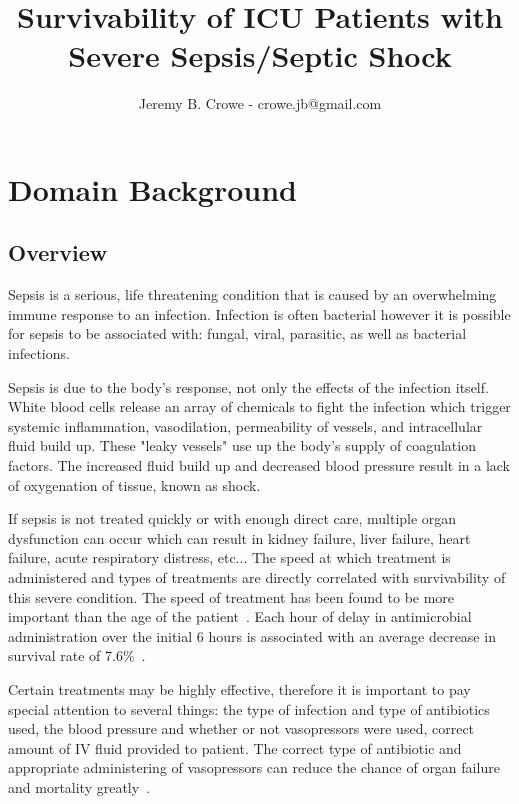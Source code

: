 \documentclass[11pt]{article}
\begin{document}
\title{Survivability of ICU Patients with Severe Sepsis/Septic Shock}
\author{Jeremy B. Crowe - crowe.jb@gmail.com}
\maketitle

\section{Domain Background}
\subsection{Overview}
Sepsis is a serious, life threatening condition that is caused by an overwhelming immune response to an infection. Infection is often bacterial however it is possible for sepsis to be associated with: fungal, viral, parasitic, as well as bacterial infections.

Sepsis is due to the body's response, not only the effects of the infection itself. White blood cells release an array of chemicals to fight the infection which trigger systemic inflammation, vasodilation, permeability of vessels, and intracellular fluid build up. These "leaky vessels" use up the body's supply of coagulation factors. The increased fluid build up and decreased blood pressure result in a lack of oxygenation of tissue, known as shock.

If sepsis is not treated quickly or with enough direct care, multiple organ dysfunction can occur which can result in kidney failure, liver failure, heart failure, acute respiratory distress, etc... The speed at which treatment is administered and types of treatments are directly correlated with survivability of this severe condition. The speed of treatment has been found to be more important than the age of the patient~\cite{survival2}. Each hour of delay in antimicrobial administration over the initial 6 hours is associated with an average decrease in survival rate of 7.6\%~\cite{survival}.

Certain treatments may be highly effective, therefore it is important to pay special attention to several things: the type of infection and type of antibiotics used, the blood pressure and whether or not vasopressors were used, correct amount of IV fluid provided to patient. The correct type of antibiotic and appropriate administering of vasopressors can reduce the chance of organ failure and mortality greatly~\cite{pressors}.
\end{document}
